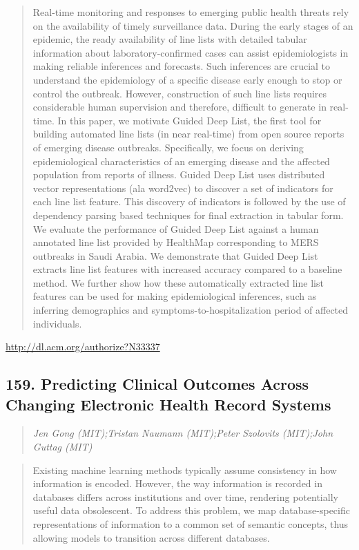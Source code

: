\documentclass{article}
\begin{document}
\begin{quote}
Real-time monitoring and responses to emerging public health threats rely on the availability of timely surveillance data. During the early stages of an epidemic, the ready availability of line lists with detailed tabular information about laboratory-confirmed cases can assist epidemiologists in making reliable inferences and forecasts. Such inferences are crucial to understand the epidemiology of a specific disease early enough to stop or control the outbreak. However, construction of such line lists requires considerable human supervision and therefore, difficult to generate in real-time. In this paper, we motivate Guided Deep List, the first tool for building automated line lists (in near real-time) from open source reports of emerging disease outbreaks. Specifically, we focus on deriving epidemiological characteristics of an emerging disease and the affected population from reports of illness. Guided Deep List uses distributed vector representations (ala word2vec) to discover a set of indicators for each line list feature. This discovery of indicators is followed by the use of dependency parsing based techniques for final extraction in tabular form. We evaluate the performance of Guided Deep List against a human annotated line list provided by HealthMap corresponding to MERS outbreaks in Saudi Arabia. We demonstrate that Guided Deep List extracts line list features with increased accuracy compared to a baseline method. We further show how these automatically extracted line list features can be used for making epidemiological inferences, such as inferring demographics and symptoms-to-hospitalization period of affected individuals.
\end{quote}

\href{http://dl.acm.org/authorize?N33337}{http://dl.acm.org/authorize?N33337}

\subsection{159. Predicting Clinical Outcomes Across Changing Electronic Health Record Systems}

\begin{quote}
\footnotesize{\textit{Jen Gong (MIT);Tristan Naumann (MIT);Peter Szolovits (MIT);John Guttag (MIT)}}

\end{quote}

\begin{quote}
Existing machine learning methods typically assume consistency in how information is encoded. However, the way information is recorded in databases differs across institutions and over time, rendering potentially useful data obsolescent. To address this problem, we map database-specific representations of information to a common set of semantic concepts, thus allowing models to transition across different databases.
\end{quote}
\end{document}
